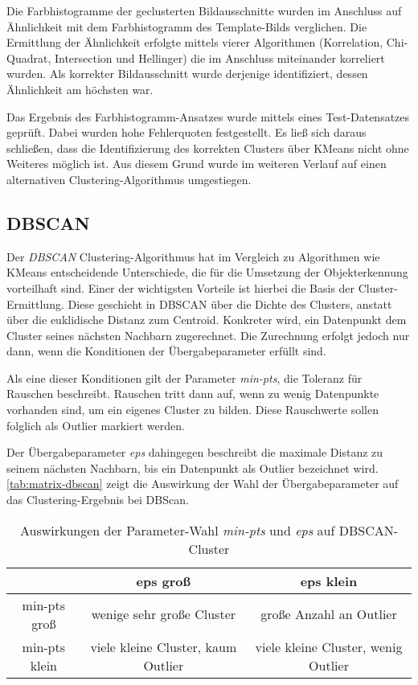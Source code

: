 \documentclass[
    type=Projektarbeit,
    status=draft, %
    language=german, %
    bibengine=bibtex,
]{unibwm-inf-thesis}
\begin{document}
    Die Farbhistogramme der geclusterten Bildausschnitte wurden im Anschluss auf Ähnlichkeit mit dem Farbhistogramm des Template-Bilds verglichen.
    Die Ermittlung der Ähnlichkeit erfolgte mittels vierer Algorithmen (Korrelation, Chi-Quadrat, Intersection und Hellinger) die im Anschluss miteinander korreliert wurden.
    Als korrekter Bildausschnitt wurde derjenige identifiziert, dessen Ähnlichkeit am höchsten war.

    Das Ergebnis des Farbhistogramm-Ansatzes wurde mittels eines Test-Datensatzes geprüft.
    Dabei wurden hohe Fehlerquoten festgestellt.
    Es ließ sich daraus schließen, dass die Identifizierung des korrekten Clusters über KMeans nicht ohne Weiteres möglich ist.
    Aus diesem Grund wurde im weiteren Verlauf auf einen alternativen Clustering-Algorithmus umgestiegen.

    \subsection{DBSCAN}
    Der \textit{DBSCAN} Clustering-Algorithmus hat im Vergleich zu Algorithmen wie KMeans entscheidende Unterschiede, die für die Umsetzung der Objekterkennung vorteilhaft sind.
    Einer der wichtigsten Vorteile ist hierbei die Basis der Cluster-Ermittlung.
    Diese geschieht in DBSCAN über die Dichte des Clusters, anstatt über die euklidische Distanz zum Centroid.
    Konkreter wird, ein Datenpunkt dem Cluster seines nächsten Nachbarn zugerechnet.
    Die Zurechnung erfolgt jedoch nur dann, wenn die Konditionen der Übergabeparameter erfüllt sind.

    Als eine dieser Konditionen gilt der Parameter \textit{min-pts}, die Toleranz für Rauschen beschreibt.
    Rauschen tritt dann auf, wenn zu wenig Datenpunkte vorhanden sind, um ein eigenes Cluster zu bilden.
    Diese Rauschwerte sollen folglich als Outlier markiert werden.

    Der Übergabeparameter \textit{eps} dahingegen beschreibt die maximale Distanz zu seinem nächsten Nachbarn, bis ein Datenpunkt als Outlier bezeichnet wird.
    \autoref{tab:matrix-dbscan} zeigt die Auswirkung der Wahl der Übergabeparameter auf das Clustering-Ergebnis bei DBScan.
    \begin{table}[h]
        \centering
        \begin{tabular}{c | c | c}
            & eps groß & eps klein \\ \hline
            min-pts groß & wenige sehr große Cluster & große Anzahl an Outlier\\ \hline
            min-pts klein & viele kleine Cluster, kaum Outlier & viele kleine Cluster, wenig Outlier
        \end{tabular}
        \caption{Auswirkungen der Parameter-Wahl \textit{min-pts} und \textit{eps} auf DBSCAN-Cluster}
        \label{tab:matrix-dbscan}
    \end{table}
\end{document}
